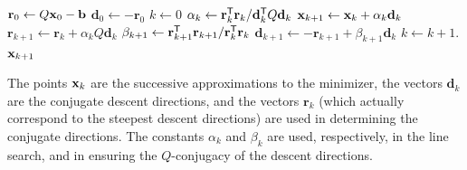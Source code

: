 \begin{algorithm}[H]
\begin{algorithmic}[1]
    \State $\mathbf{r}_0 \gets Q\mathbf{x}_0 - \mathbf{b}$
    \State $\mathbf{d}_0 \gets -\mathbf{r}_0$
    \State $k \gets 0$
        \State $\alpha_k \gets \mathbf{r}_k^{\mathsf T} \mathbf{r}_k / \mathbf{d}_k^{\mathsf T} Q\mathbf{d}_k$
        \State $\mathbf{x}_{k+1} \gets \mathbf{x}_k + \alpha_k \mathbf{d}_k$
        \State $\mathbf{r}_{k+1} \gets \mathbf{r}_k + \alpha_k Q\mathbf{d}_k$
        \State $\beta_{k+1} \gets \mathbf{r}_{k+1}^{\mathsf T} \mathbf{r}_{k+1} / \mathbf{r}_k^{\mathsf T} \mathbf{r}_k$
        \State $\mathbf{d}_{k+1} \gets -\mathbf{r}_{k+1} + \beta_{k+1}\mathbf{d}_k$
        \State $k \gets k+1$.
    \EndWhile
     $\mathbf{x}_{k+1}$
\EndProcedure
\end{algorithmic}
\caption{}
\label{Alg:linear-conjugate-gradient}
\end{algorithm}

The points $\mathbf{x}_k$ are the successive approximations to the minimizer, the vectors $\mathbf{d}_k$ are the conjugate descent directions, and the vectors $\mathbf{r}_k$ (which actually correspond to the steepest descent directions) are used in determining the conjugate directions.
The constants $\alpha_k$ and $\beta_k$ are used, respectively, in the line search, and in ensuring the $Q$-conjugacy of the descent directions.

